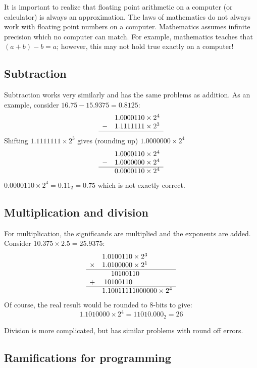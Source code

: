 {It is important to realize that floating point arithmetic on a
computer (or calculator) is always an approximation. The laws of
mathematics do not always work with floating point numbers on a
computer.  Mathematics assumes infinite precision which no computer
can match. For example, mathematics teaches that $(a + b) - b = a$;
however, this may not hold true exactly on a computer!

\subsection{Subtraction}
Subtraction works very similarly and has the same problems as addition. As
an example, consider $16.75 - 15.9375 = 0.8125$:
\[
\begin{array}{rr}
 & 1.0000110 \times 2^4 \\
-& 1.1111111 \times 2^3 \\ \hline
\end{array}
\]
Shifting $1.1111111 \times 2^3$ gives (rounding up) $1.0000000 \times 2^4$
\[
\begin{array}{rr}
 & 1.0000110 \times 2^4 \\
-& 1.0000000 \times 2^4 \\ \hline
 & 0.0000110 \times 2^4
\end{array}
\]
$0.0000110 \times 2^4 = 0.11_2 = 0.75$ which is not exactly correct.

\subsection{Multiplication and division}

For multiplication, the significands are multiplied and the exponents are
added. Consider $10.375 \times 2.5 = 25.9375$:
\[
\begin{array}{rr@{}l}
 &  1.0&100110 \times 2^3 \\
\times &  1.0&100000 \times 2^1 \\ \hline
 &     &10100110 \\
+&   10&100110   \\ \hline
 &   1.1&0011111000000 \times 2^4
\end{array}
\]
Of course, the real result would be rounded to 8-bits to give:
\[1.1010000 \times 2^4 = 11010.000_2 = 26 \]

Division is more complicated, but has similar problems with round off errors.

\subsection{Ramifications for programming}

}
